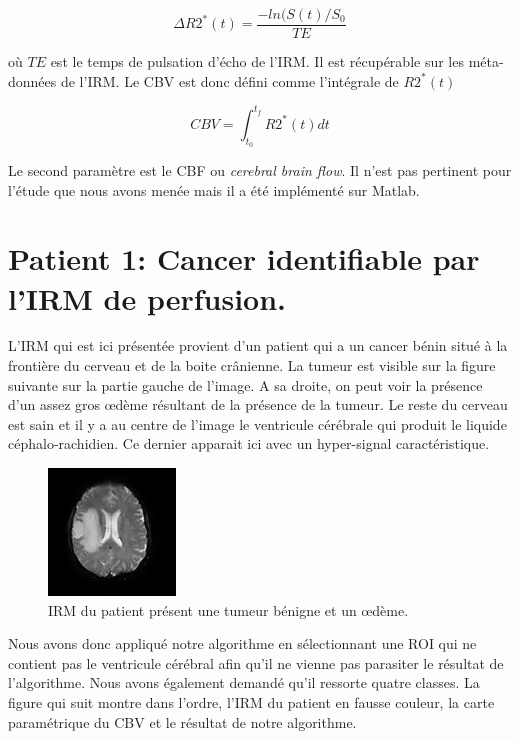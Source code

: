 \begin{equation}
\Delta R2^*(t) = \frac{-ln(S(t)/S_0}{TE}
\end{equation}

où $TE$ est le temps de pulsation d'écho de l'IRM. Il est récupérable sur les méta-données de l'IRM. Le CBV est donc défini comme l'intégrale de $R2^*(t)$

\begin{equation}
CBV = \int^{t_f}_{t_0} R2^*(t) dt
\end{equation}

Le second paramètre est le CBF ou \textit{cerebral brain flow}. Il n'est pas pertinent pour l'étude que nous avons menée mais il a été implémenté sur Matlab.

\medskip



\section{Patient 1: Cancer identifiable par l'IRM de perfusion.}

L'IRM qui est ici présentée provient d'un patient qui a un cancer bénin situé à la frontière du cerveau et de la boite crânienne. La tumeur est visible sur la figure suivante sur la partie gauche de l'image. A sa droite, on peut voir la présence d'un assez gros œdème résultant de la présence de la tumeur. Le reste du cerveau est sain et il y a au centre de l'image le ventricule cérébrale qui produit le liquide céphalo-rachidien. Ce dernier apparait ici avec un hyper-signal caractéristique.

\begin{figure}[H]
\centering
    \includegraphics[scale=2,angle=0]{Images/Patient4IRM.png}
    \caption{IRM du patient présent une tumeur bénigne et un œdème.}
    \label{fig:patient4IRM}
\end{figure}

Nous avons donc appliqué notre algorithme en sélectionnant une ROI qui ne contient pas le ventricule cérébral afin qu'il ne vienne pas parasiter le résultat de l'algorithme. Nous avons également demandé qu'il ressorte quatre classes. La figure qui suit montre dans l'ordre, l'IRM du patient en fausse couleur, la carte paramétrique du CBV et le résultat de notre algorithme.

